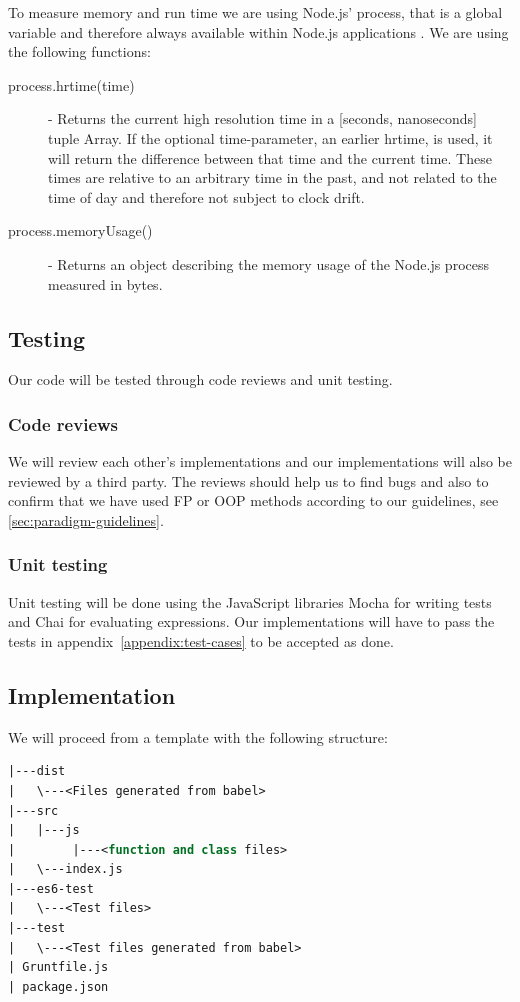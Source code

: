 \documentclass {article}
\begin{document}
To measure memory and run time we are using Node.js' process, that is a global variable and therefore always available within Node.js applications \cite{nodejs}. We are using the following functions:
\begin{description}
\item [process.hrtime(time)] - Returns the current high resolution time in a [seconds, nanoseconds] tuple Array. If the optional time-parameter, an earlier hrtime, is used, it will return the difference between that time and the current time. These times are relative to an arbitrary time in the past, and not related to the time of day and therefore not subject to clock drift.
\item [process.memoryUsage()] - Returns an object describing the memory usage of the Node.js process measured in bytes.
\end{description}
\subsection{Testing}
Our code will be tested through code reviews and unit testing.
\subsubsection{Code reviews}
We will review each other's implementations and our implementations will also be reviewed by a third party. The reviews should help us to find bugs and also to confirm that we have used FP or OOP methods according to our guidelines, see \ref{sec:paradigm-guidelines}.
\subsubsection{Unit testing}
Unit testing will be done using the JavaScript libraries Mocha \cite{mocha} for writing tests and Chai \cite{chai} for evaluating expressions. Our implementations will have to pass the tests in appendix~\ref{appendix:test-cases} to be accepted as done.
\subsection{Implementation}
We will proceed from a template with the following structure:

\begin{lstlisting}[language=Pascal, deletekeywords={function, and}, numbers=none]
|---dist
|   \---<Files generated from babel>
|---src
|   |---js
|        |---<function and class files>
|   \---index.js
|---es6-test
|   \---<Test files>
|---test
|   \---<Test files generated from babel>
| Gruntfile.js
| package.json
\end{lstlisting}
\end{document}
